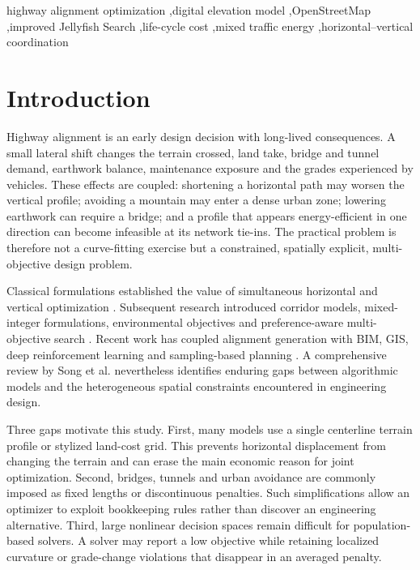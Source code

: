 \documentclass[preprint,12pt]{elsarticle}
\begin{document}
\begin{frontmatter}
\begin{keyword}
highway alignment optimization \sep digital elevation model \sep OpenStreetMap \sep improved Jellyfish Search \sep life-cycle cost \sep mixed traffic energy \sep horizontal--vertical coordination
\end{keyword}
\end{frontmatter}

\linenumbers

\section{Introduction}

Highway alignment is an early design decision with long-lived consequences. A small lateral shift changes the terrain crossed, land take, bridge and tunnel demand, earthwork balance, maintenance exposure and the grades experienced by vehicles. These effects are coupled: shortening a horizontal path may worsen the vertical profile; avoiding a mountain may enter a dense urban zone; lowering earthwork can require a bridge; and a profile that appears energy-efficient in one direction can become infeasible at its network tie-ins. The practical problem is therefore not a curve-fitting exercise but a constrained, spatially explicit, multi-objective design problem.

Classical formulations established the value of simultaneous horizontal and vertical optimization \cite{chew1989,jong2003}. Subsequent research introduced corridor models, mixed-integer formulations, environmental objectives and preference-aware multi-objective search \cite{kang2012,mondal2015,hirpa2016,vazquez2018,akhmet2022}. Recent work has coupled alignment generation with BIM, GIS, deep reinforcement learning and sampling-based planning \cite{han2023,he2023,alhadad2024,pu2024}. A comprehensive review by Song et al. \cite{songreview2023} nevertheless identifies enduring gaps between algorithmic models and the heterogeneous spatial constraints encountered in engineering design.

Three gaps motivate this study. First, many models use a single centerline terrain profile or stylized land-cost grid. This prevents horizontal displacement from changing the terrain and can erase the main economic reason for joint optimization. Second, bridges, tunnels and urban avoidance are commonly imposed as fixed lengths or discontinuous penalties. Such simplifications allow an optimizer to exploit bookkeeping rules rather than discover an engineering alternative. Third, large nonlinear decision spaces remain difficult for population-based solvers. A solver may report a low objective while retaining localized curvature or grade-change violations that disappear in an averaged penalty.
\end{document}
